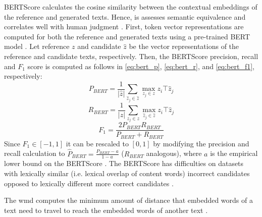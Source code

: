 
BERTScore calculates the cosine similarity between the contextual embeddings of the reference and generated texts. 
Hence, is assesses semantic equivalence and correlates well with human judgment \citep{kurt_pehlivanoglu_comparative_2024}.
First, token vector representations are computed for both the reference and generated texts using a pre-trained BERT model \citep{hanna_fine_grained_2021}.
Let reference $z$ and candidate $\hat{z}$ be the vector representations of the reference and candidate texts, respectively.
Then, the BERTScore precision, recall and $F_1$ score is computed as follows in \autoref{eq:bert_p}, \autoref{eq:bert_r}, and \autoref{eq:bert_f1}, respectively:
\begin{equation}
    P_{BERT} = \frac{1}{|\hat{z}|} \sum_{\hat{z}_j \in \hat{z}} \max_{z_j \in z} z_i\top \hat{z}_j
\label{eq:bert_p}
\end{equation}
\begin{equation}
    R_{BERT} = \frac{1}{|z|} \sum_{z_j \in z} \max_{\hat{z}_j \in \hat{z}} z_i\top \hat{z}_j
\label{eq:bert_r}
\end{equation}
\begin{equation}
    F_1 = \frac{2 P_{BERT} R_{BERT}}{P_{BERT} + R_{BERT}} 
\label{eq:bert_f1}
\end{equation}
Since $F_1 \in \left[-1,1\right]$ it can be rescaled to $[0,1]$ by modifying the precision and recall calculation 
to $\hat{P}_{BERT} = \frac{P_{BERT} - a}{1 - a}$ ($R_{BERT}$ analogous), where $a$ is the empirical lower bound on the BERTScore \citep{hanna_fine_grained_2021}.
The BERTScore has difficulties on datasets with lexically similar (i.e. lexical overlap of content words) incorrect candidates 
opposed to lexically different more correct candidates \citep{hanna_fine_grained_2021}.

The \ac{wmd} computes the minimum amount of distance that embedded words of a text need to travel 
to reach the embedded words of another text \citep{gohsen_captions_2023}.


